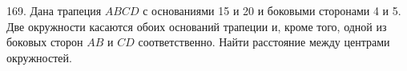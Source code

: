169. Дана трапеция $ABCD$ с основаниями 15 и 20 и боковыми сторонами 4 и 5. Две окружности касаются обоих оснований трапеции и, кроме того, одной из боковых сторон $AB$ и $CD$ соответственно. Найти расстояние между центрами окружностей.\\
